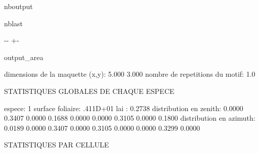 \documentclass[letterpaper,10pt,english]{sphinxmanual}
\begin{document}
\begin{sphinxuseclass}{nboutput}
\begin{sphinxuseclass}{nblast}
{

\kern-\sphinxverbatimsmallskipamount\kern-\baselineskip
\kern+\FrameHeightAdjust\kern-\fboxrule
\vspace{\nbsphinxcodecellspacing}

\begin{sphinxuseclass}{output_area}
\begin{sphinxuseclass}{}


\begin{sphinxVerbatim}[commandchars=\\\{\}]
 dimensions de la maquette (x,y):    5.000    3.000
 nombre de repetitions du motif:    1.0

 STATISTIQUES GLOBALES DE CHAQUE ESPECE

 espece:  1    surface foliaire: .411D+01    lai :  0.2738
 distribution en zenith:  0.0000 0.3407 0.0000 0.1688 0.0000 0.0000 0.3105 0.0000 0.1800
 distribution en azimuth: 0.0189 0.0000 0.3407 0.0000 0.3105 0.0000 0.0000 0.3299 0.0000


 STATISTIQUES PAR CELLULE


\end{sphinxVerbatim}
\end{sphinxuseclass}
\end{sphinxuseclass}}
\end{sphinxuseclass}
\end{sphinxuseclass}
\end{document}
